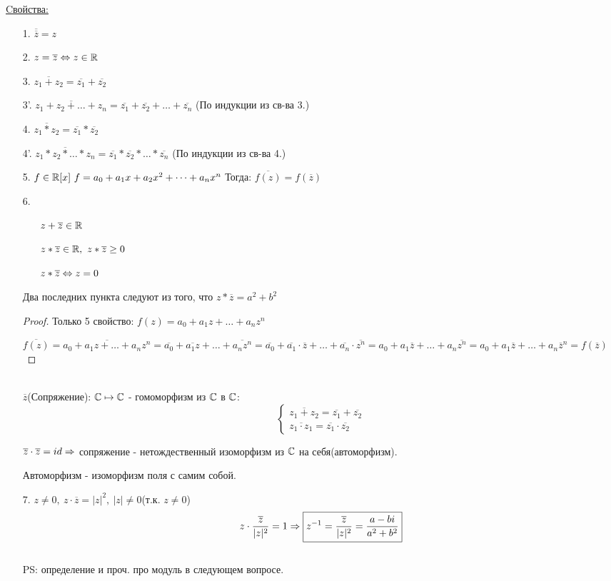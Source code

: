\underline{Cвойства:}
\begin{itemize}
\item[1.] $\overline{\overline{z}} = z$
\item[2.] $z = \overline{z} \Leftrightarrow z \in \mathbb{R}$
\item[3.] $\overline{z_1 + z_2} = \overline{z_1} + \overline{z_2}$
\item[3'.] $\overline{z_1 + z_2 + \dots + z_n} = \overline{z_1} + \overline{z_2} + \dots + \overline{z_n}$ (По индукции из св-ва 3.)
\item[4.] $\overline{z_1*z_2} = \overline{z_1} * \overline{z_2}$
\item[4'.] $\overline{z_1 * z_2 * \dots * z_n} = \overline{z_1} * \overline{z_2} * \dots * \overline{z_n}$ (По индукции из св-ва 4.)
\item[5.] $f \in \mathbb{R}[x]~f = a_0 + a_1x + a_2x^2 + \dots + a_nx^n$ Тогда: $\overline{f(z)} = f(\overline{z})$
\item[6.] \begin{itemize}
			\item[\bullet] $z + \overline{z} \in \mathbb{R}$ 
			\item[\bullet] $z*\overline{z} \in \mathbb{R},~z*\overline{z} \ge 0$
			\item[\bullet] $z*\overline{z} \Leftrightarrow z = 0$
		 \end{itemize}	
		 Два последних пункта следуют из того, что $z*\overline{z} = a^2 + b^2$
\begin{proof}
Только 5 свойство:
$f(z)=a_0 + a_1z + \dots + a_nz^n$

$\overline{f(z)} = \overline{a_0 + a_1z + \dots + a_nz^n} = \overline{a_0} + \overline{a_1z} + \dots + \overline{a_nz^n} = \overline{a_0} + \overline{a_1} \cdot \overline{z} + \dots + \overline{a_n} \cdot \overline{z^n} = a_0 + a_1\overline{z} + \dots + a_n\overline{z^n} = a_0 + a_1\overline{z} + \dots + a_n{\overline{z}}^n = f(\overline{z})$
\end{proof}   
\\

$\overline{z}$(Сопряжение): $\mathbb{C} \mapsto \mathbb{C}$ - гомоморфизм из $\mathbb{C}$ в $\mathbb{C}$:\\
$$
	\begin{cases}
	\overline{z_1 + z_2} = \overline{z_1} + \overline{z_2} \\
	\overline{z_1 \cdot z_1} = \overline{z_1} \cdot \overline{z_2}
	\end{cases}
$$

$\overline{z} \cdot \overline{z} = id \Rightarrow $ сопряжение - нетождественный изоморфизм из $\mathbb{C}$ на себя(автоморфизм).
\begin{Def}
	Автоморфизм - изоморфизм поля с самим собой.
\end{Def}
\item[7.] $z \ne 0,~z \cdot \overline{z} = |z|^2,~|z| \ne 0$(т.к. $z \ne 0$) \\
$$ z \cdot \frac{\overline{z}}{|z|^2} = 1 \Rightarrow \boxed{z^{-1} = \frac{\overline{z}}{|z|^2} = \frac{a - bi}{a^2 + b^2}} $$ \\
PS: определение и проч. про модуль в следующем вопросе.
\end{itemize}

